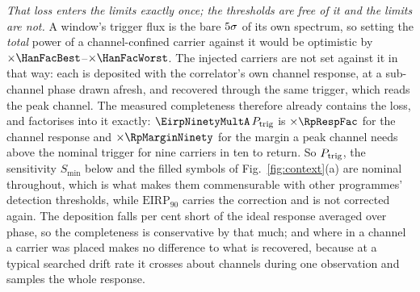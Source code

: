 \emph{That loss enters the limits exactly once; the thresholds are free of it and the limits are not.} A window's trigger flux is the
bare $5\sigma$ of its own spectrum, so setting the \emph{total}
power of a channel-confined carrier against it would be optimistic by
$\times\HanFacBest$--$\times\HanFacWorst$. The injected carriers are not set
against it in that way: each is deposited with the correlator's own channel
response, at a sub-channel phase drawn afresh, and recovered through the same
trigger, which reads the peak channel. The measured completeness therefore
already contains the loss, and factorises into it exactly:
$\EirpNinetyMultA\,P_{\rm trig}$ is $\times\RpRespFac$ for the channel
response and $\times\RpMarginNinety$ for the margin a peak channel needs
above the nominal trigger for nine carriers in ten to return. So
$P_{\rm trig}$, the sensitivity $S_{\min}$ below and the filled symbols of
Fig.~\ref{fig:context}(a) are nominal throughout, which is what makes them
commensurable with other programmes' detection thresholds, while
$\mathrm{EIRP}_{90}$ carries the correction and is not corrected again.
The deposition falls \InjShortPct{} per cent short of the ideal response
averaged over phase, so the completeness is conservative by that much; and
where in a channel a carrier was placed makes no difference to what is
recovered, because at a typical searched drift rate it crosses about
\InjDriftChan{} channels during one observation and samples the whole
response.

